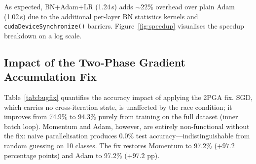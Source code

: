 \documentclass[conference]{IEEEtran}
\begin{document}
As expected, BN+Adam+LR (1.24\,s) adds $\sim$22\% overhead over plain Adam (1.02\,s) due to the additional per-layer BN statistics kernels and \texttt{cudaDeviceSynchronize()} barriers. Figure~\ref{fig:speedup} visualises the speedup breakdown on a log scale.

\begin{table}[htbp]
\caption{Training Performance — MNIST, 20 Epochs, Batch 2048}
\begin{center}
\label{tab:performance}
\end{center}
\end{table}

\subsection{Impact of the Two-Phase Gradient Accumulation Fix}

Table~\ref{tab:bugfix} quantifies the accuracy impact of applying the 2PGA fix. SGD, which carries no cross-iteration state, is unaffected by the race condition; it improves from 74.9\% to 94.3\% purely from training on the full dataset (inner batch loop). Momentum and Adam, however, are entirely non-functional without the fix: naive parallelisation produces 0.0\% test accuracy—indistinguishable from random guessing on 10 classes. The fix restores Momentum to 97.2\% ($+97.2$ percentage points) and Adam to 97.2\% ($+97.2$ pp).
\end{document}
